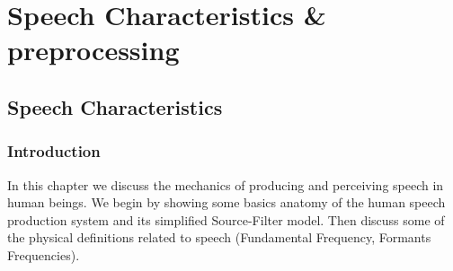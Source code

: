 \documentclass[12pt, a4paper, twoside]{report}
\begin{document}

\chapter{Speech Characteristics \& preprocessing}
\section{Speech Characteristics}
\subsection{Introduction}
In this chapter we discuss the mechanics of producing and perceiving speech in human beings. We begin by showing some basics anatomy of the human speech production system and its simplified Source-Filter model. Then discuss some of the physical definitions related to speech (Fundamental Frequency, Formants Frequencies).
\end{document}
